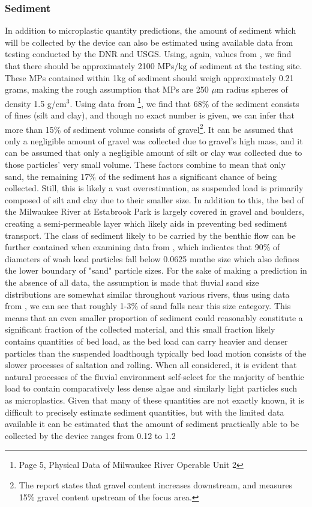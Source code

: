 \documentclass[fleqn,10pt]{SelfArx} %
\begin{document}
	\subsubsection{Sediment}
	In addition to microplastic quantity predictions, the amount of sediment which will be collected by the device can also be estimated using available data from testing conducted by the DNR and USGS. Using, again, values from \cite{LenakerEtAlvertdist}, we find that there should be approximately 2100 MPs/kg of sediment at the testing site. These MPs contained within 1kg of sediment should weigh approximately 0.21 grams, making the rough assumption that MPs are 250 $\mu$m radius spheres of density 1.5 g/cm$^3$. Using data from \cite{Foth2020}\footnote{Page 5, Physical Data of Milwaukee River Operable Unit 2}, we find that 68\% of the sediment consists of fines (silt and clay), and though no exact number is given, we can infer that more than 15\% of sediment volume consists of gravel\footnote{The report states that gravel content increases downstream, and measures 15\% gravel content upstream of the focus area.}. It can be assumed that only a negligible amount of gravel was  collected due to gravel's high mass, and it can be assumed that only a negligible amount of silt or clay was collected due to those particles' very small volume. These factors combine to mean that only sand, the remaining 17\% of the sediment has a significant chance of being collected. Still, this is likely a vast overestimation, as suspended load is primarily composed of silt and clay due to their smaller size. In addition to this, the bed of the Milwaukee River at Estabrook Park is largely covered in gravel and boulders, creating a semi-permeable layer which likely aids in preventing bed sediment transport. The class of sediment likely to be carried by the \gls{benthic} flow can be further contained when examining data from \cite{Washload_size}, which indicates that 90\% of diameters of wash load particles fall below 0.0625 mm\textemdash the size which also defines the lower boundary of "sand" particle sizes. For the sake of making a prediction in the absence of all data, the assumption is made that fluvial sand size distributions are somewhat similar throughout various rivers, thus using data from \cite{sabd_size_distribution}, we can see that roughly 1-3\% of sand falls near this size category. This means that an even smaller proportion of sediment could reasonably constitute a significant fraction of the collected material, and this small fraction likely contains quantities of bed load, as the bed load can carry heavier and denser particles than the suspended load\textemdash though typically bed load motion consists of the slower processes of \gls{saltation} and \gls{rolling}. When all considered, it is evident that natural processes of the fluvial environment self-select for the majority of \gls{benthic} load to contain comparatively less dense algae and similarly light particles such as microplastics. Given that many of these quantities are not exactly known, it is difficult to precisely estimate sediment quantities, but with the limited data available it can be estimated that the amount of sediment practically able to be collected by the device ranges from 0.12 to 1.2 
\end{document}
